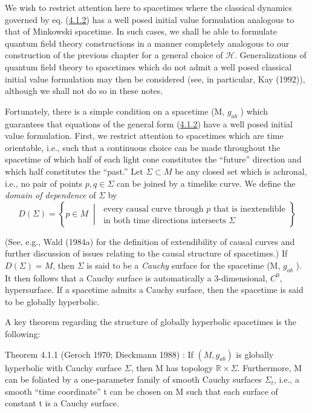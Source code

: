\documentclass[11pt,a4paper]{article}
\begin{document}
We wish to restrict attention here to spacetimes where the classical dynamics governed by eq. (\hyperref[eq:4.1.2]{4.1.2}) has a well posed initial value formulation analogous to that of Minkowski spacetime. In such cases, we shall be able to formulate quantum field theory constructions in a manner completely analogous to our construction of the previous chapter for a general choice of \(\mathcal{H}\). Generalizations of quantum field theory to spacetimes which do not admit a well posed classical initial value formulation may then be considered (see, in particular, Kay (1992)), although we shall not do so in these notes.

Fortunately, there is a simple condition on a spacetime (M, \(g_{ab}\) ) which guarantees that equations of the general form (\hyperref[eq:4.1.2]{4.1.2}) have a well posed initial value formulation. First, we restrict attention to spacetimes which are time orientable, i.e., such that a continuous choice can be made throughout the spacetime of which half of each light cone constitutes the ``future'' direction and which half constitutes the ``past.'' Let \(\Sigma \subset M\) be any closed set which is achronal, i.e., no pair of points \(p,q \in \Sigma\) can be joined by a timelike curve. We define the \emph{domain of dependence} of \(\Sigma\) by
\begin{equation*}
D(\Sigma)=\left\{p\in M\;\middle|\;
\begin{array}{l}
\text{every causal curve through }p\text{ that is inextendible}\\
\text{in both time directions intersects }\Sigma
\end{array}\right\} \tag{4.1.3}\label{eq:4.1.3}
\end{equation*}

(See, e.g., Wald (1984a) for the definition of extendibility of causal curves and further discussion of issues relating to the causal structure of spacetimes.) If \(D(\Sigma) = M\), then \(\Sigma\) is said to be a \emph{Cauchy} \hypertarget{source-69}{} surface for the spacetime (M, \(g_{ab}\) ). It then follows that a Cauchy surface is automatically a 3-dimensional, \(C^0\), hypersurface. If a spacetime admits a Cauchy surface, then the spacetime is said to be globally hyperbolic.

A key theorem regarding the structure of globally hyperbolic spacetimes is the following:

Theorem 4.1.1 (Geroch 1970; Dieckmann 1988) : If \((M, g_{ab})\) is globally hyperbolic with Cauchy surface \(\Sigma\), then M has topology \(\mathbb{R} \times \Sigma\). Furthermore, M can be foliated by a one-parameter family of smooth Cauchy surfaces \(\Sigma_t\), i.e., a smooth ``time coordinate'' t can be chosen on M such that each surface of constant t is a Cauchy surface.
\end{document}

